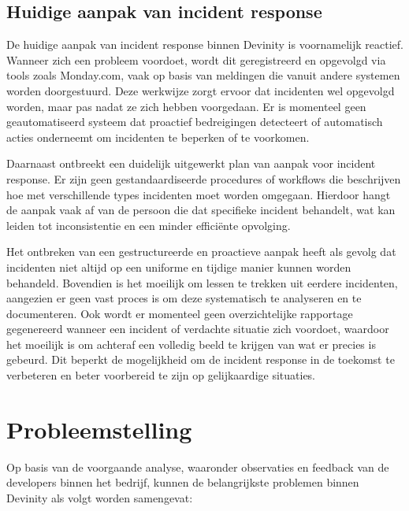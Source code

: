 \subsection{Huidige aanpak van incident response}
De huidige aanpak van incident response binnen Devinity is voornamelijk reactief. Wanneer zich een probleem voordoet, wordt dit geregistreerd en opgevolgd via tools zoals Monday.com, vaak op basis van meldingen die vanuit andere systemen worden doorgestuurd. Deze werkwijze zorgt ervoor dat incidenten wel opgevolgd worden, maar pas nadat ze zich hebben voorgedaan. Er is momenteel geen geautomatiseerd systeem dat proactief bedreigingen detecteert of automatisch acties onderneemt om incidenten te beperken of te voorkomen.

Daarnaast ontbreekt een duidelijk uitgewerkt plan van aanpak voor incident response. Er zijn geen gestandaardiseerde procedures of workflows die beschrijven hoe met verschillende types incidenten moet worden omgegaan. Hierdoor hangt de aanpak vaak af van de persoon die dat specifieke incident behandelt, wat kan leiden tot inconsistentie en een minder efficiënte opvolging.

Het ontbreken van een gestructureerde en proactieve aanpak heeft als gevolg dat incidenten niet altijd op een uniforme en tijdige manier kunnen worden behandeld. Bovendien is het moeilijk om lessen te trekken uit eerdere incidenten, aangezien er geen vast proces is om deze systematisch te analyseren en te documenteren. Ook wordt er momenteel geen overzichtelijke rapportage gegenereerd wanneer een incident of verdachte situatie zich voordoet, waardoor het moeilijk is om achteraf een volledig beeld te krijgen van wat er precies is gebeurd. Dit beperkt de mogelijkheid om de incident response in de toekomst te verbeteren en beter voorbereid te zijn op gelijkaardige situaties.


\section{Probleemstelling}
Op basis van de voorgaande analyse, waaronder observaties en feedback van de developers binnen het bedrijf, kunnen de belangrijkste problemen binnen Devinity als volgt worden samengevat:

